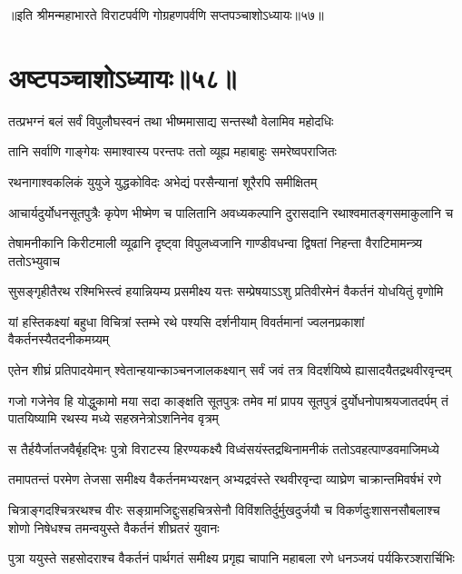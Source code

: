 ॥इति श्रीमन्महाभारते विराटपर्वणि गोग्रहणपर्वणि सप्तपञ्चाशोऽध्यायः॥५७॥

\chapter{अष्टपञ्चाशोऽध्यायः॥५८॥}

\twolineshloka
{तत्प्रभग्नं बलं सर्वं विपुलौघस्वनं तथा}
{भीष्ममासाद्य सन्तस्थौ वेलामिव महोदधिः}


\twolineshloka
{तानि सर्वाणि गाङ्गेयः समाश्वास्य परन्तपः}
{ततो व्यूह्य महाबाहुः समरेष्वपराजितः}


\twolineshloka
{रथनागाश्वकलिकं युयुजे युद्धकोविदः}
{अभेद्यं परसैन्यानां शूरैरपि समीक्षितम्}


\twolineshloka
{आचार्यदुर्योधनसूतपुत्रैः कृपेण भीष्मेण च पालितानि}
{अवध्यकल्पानि दुरासदानि रथाश्वमातङ्गसमाकुलानि च}


\twolineshloka
{तेषामनीकानि किरीटमाली व्यूढानि दृष्ट्वा विपुलध्वजानि}
{गाण्डीवधन्वा द्विषतां निहन्ता वैराटिमामन्त्र्य ततोऽभ्युवाच}


\twolineshloka
{सुसङ्गृहीतैरथ रश्मिभिस्त्वं हयान्नियम्य प्रसमीक्ष्य यत्तः}
{सम्प्रेषयाऽऽशु प्रतिवीरमेनं वैकर्तनं योधयितुं वृणोमि}


\twolineshloka
{यां हस्तिकक्ष्यां बहुधा विचित्रां स्तम्भे रथे पश्यसि दर्शनीयाम्}
{विवर्तमानां ज्वलनप्रकाशां वैकर्तनस्यैतदनीकमग्र्यम्}


\twolineshloka
{एतेन शीघ्रं प्रतिपादयेमान् श्वेतान्हयान्काञ्चनजालकक्ष्यान्}
{सर्वं जवं तत्र विदर्शयिष्ये ह्यासादयैतद्रथवीरवृन्दम्}


\threelineshloka
{गजो गजेनेव हि योद्धुकामो मया सदा काङ्क्षति सूतपुत्रः}
{तमेव मां प्रापय सूतपुत्रं दुर्योधनोपाश्रयजातदर्पम्}
{तं पातयिष्यामि रथस्य मध्ये सहस्रनेत्रोऽशनिनेव वृत्रम्}



\twolineshloka
{स तैर्हयैर्जातजवैर्बृहद्भिः पुत्रो विराटस्य हिरण्यकक्ष्यै}
{विध्वंसयंस्तद्रथिनामनीकं ततोऽवहत्पाण्डवमाजिमध्ये}


\twolineshloka
{तमापतन्तं परमेण तेजसा समीक्ष्य वैकर्तनमभ्यरक्षन्}
{अभ्यद्रवंस्ते रथवीरवृन्दा व्याघ्रेण चाक्रान्तमिवर्षभं रणे}


\threelineshloka
{चित्राङ्गदश्चित्ररथश्च वीरः सङ्ग्रामजिद्दुःसहचित्रसेनौ}
{विविंशतिर्दुर्मुखदुर्जयौ च विकर्णदुःशासनसौबलाश्च}
{शोणो निषेधश्च तमन्वयुस्ते वैकर्तनं शीघ्रतरं युवानः}


\twolineshloka
{पुत्रा ययुस्ते सहसोदराश्च वैकर्तनं पार्थगतं समीक्ष्य}
{प्रगृह्य चापानि महाबला रणे धनञ्जयं पर्यकिरञ्शरार्चिभिः}


